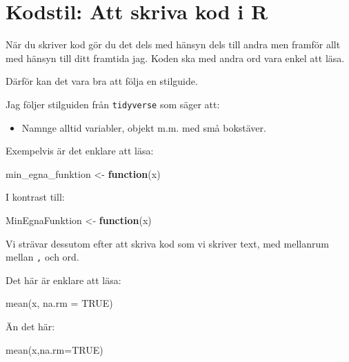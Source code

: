 \documentclass[
]{book}
\newenvironment{Shaded}{\begin{snugshade}}{\end{snugshade}}
\newcommand{\AttributeTok}[1]{\textcolor[rgb]{0.77,0.63,0.00}{#1}}
\newcommand{\ConstantTok}[1]{\textcolor[rgb]{0.00,0.00,0.00}{#1}}
\newcommand{\ControlFlowTok}[1]{\textcolor[rgb]{0.13,0.29,0.53}{\textbf{#1}}}
\newcommand{\FunctionTok}[1]{\textcolor[rgb]{0.00,0.00,0.00}{#1}}
\newcommand{\NormalTok}[1]{#1}
\newcommand{\OtherTok}[1]{\textcolor[rgb]{0.56,0.35,0.01}{#1}}
\providecommand{\tightlist}{%
  \setlength{\itemsep}{0pt}\setlength{\parskip}{0pt}}
\begin{document}
\hypertarget{kodstil-att-skriva-kod-i-r}{%
\section{Kodstil: Att skriva kod i R}\label{kodstil-att-skriva-kod-i-r}}

När du skriver kod gör du det dels med hänsyn dels till andra men framför allt med hänsyn till ditt framtida jag. Koden ska med andra ord vara enkel att läsa.

Därför kan det vara bra att följa en stilguide.

Jag följer stilguiden från \texttt{tidyverse} som säger att:

\begin{itemize}
\tightlist
\item
  Namnge alltid variabler, objekt m.m. med små bokstäver.
\end{itemize}

Exempelvis är det enklare att läsa:

\begin{Shaded}
\begin{Highlighting}[]
\NormalTok{min\_egna\_funktion }\OtherTok{\textless{}{-}} \ControlFlowTok{function}\NormalTok{(x)}
\end{Highlighting}
\end{Shaded}

I kontrast till:

\begin{Shaded}
\begin{Highlighting}[]
\NormalTok{MinEgnaFunktion }\OtherTok{\textless{}{-}} \ControlFlowTok{function}\NormalTok{(x)}
\end{Highlighting}
\end{Shaded}

Vi strävar dessutom efter att skriva kod som vi skriver text, med mellanrum mellan \texttt{,} och ord.

Det här är enklare att läsa:

\begin{Shaded}
\begin{Highlighting}[]
\FunctionTok{mean}\NormalTok{(x, }\AttributeTok{na.rm =} \ConstantTok{TRUE}\NormalTok{)}
\end{Highlighting}
\end{Shaded}

Än det här:

\begin{Shaded}
\begin{Highlighting}[]
\FunctionTok{mean}\NormalTok{(x,}\AttributeTok{na.rm=}\ConstantTok{TRUE}\NormalTok{)}
\end{Highlighting}
\end{Shaded}
\end{document}
